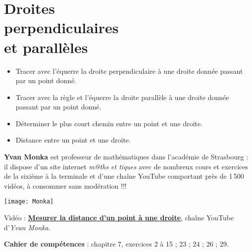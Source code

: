 \themaG
\graphicspath{{../Ch10_Droites_perpendiculaires_paralleles/Images/}}

\chapter{Droites\\perpendiculaires\\et parallèles}
\label{C15}

\begin{prerequis}
   \begin{itemize}
      \item Tracer avec l’équerre la droite perpendiculaire à une droite donnée passant par un point donné.
      \item Tracer avec la règle et l’équerre la droite parallèle à une droite donnée passant par un point donné.
      \item Déterminer le plus court chemin entre un point et une droite.
      \item Distance entre un point et une droite.
   \end{itemize}
\end{prerequis}

\vfill

\begin{debat} 
   {\bf Yvan Monka} est professeur de mathématiques dans l'académie de Strasbourg : il dispose d'un site internet {\it m@ths et tiques} avec de nombreux cours et exercices de la sixième à la terminale et d'une chaîne YouTube comportant près de 1\,500 vidéos, à consommer sans modération !!! \\
   \begin{center}
      \texttt{[image: Monka]}
   \end{center}
   \bigskip
   \begin{cadre}[B2][F4]
      \begin{center}
         Vidéo : \href{https://www.youtube.com/watch?v=tUzoATZrAmc}{\bf Mesurer la distance d'un point à une droite}, chaîne YouTube d'{\it Yvan Monka}.
      \end{center}
   \end{cadre}
\end{debat}

\vfill

\textcolor{PartieGeometrie}{\sffamily\bfseries Cahier de compétences} : chapitre 7, exercices 2 à 15 ; 23 ; 24 ; 26 ; 29.


